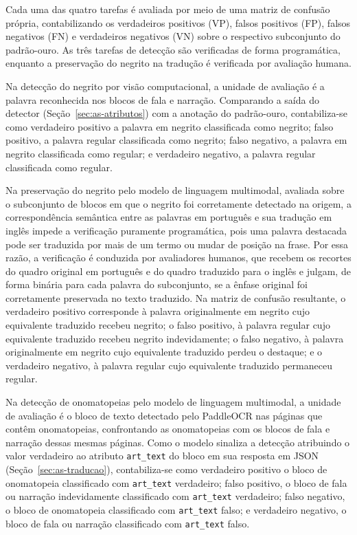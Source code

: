\documentclass[
    12pt,
    openright,
    oneside,
    a4paper,
    chapter=TITLE,
    section=TITLE,
    english,
    brazilian,
    brazil
]{abntex2}
\begin{document}
Cada uma das quatro tarefas é avaliada por meio de uma matriz de confusão própria, contabilizando os verdadeiros positivos (VP), falsos positivos (FP), falsos negativos (FN) e verdadeiros negativos (VN) sobre o respectivo subconjunto do padrão-ouro. As três tarefas de detecção são verificadas de forma programática, enquanto a preservação do negrito na tradução é verificada por avaliação humana.

Na detecção do negrito por visão computacional, a unidade de avaliação é a palavra reconhecida nos blocos de fala e narração. Comparando a saída do detector (Seção~\ref{sec:as-atributos}) com a anotação do padrão-ouro, contabiliza-se como verdadeiro positivo a palavra em negrito classificada como negrito; falso positivo, a palavra regular classificada como negrito; falso negativo, a palavra em negrito classificada como regular; e verdadeiro negativo, a palavra regular classificada como regular.

Na preservação do negrito pelo modelo de linguagem multimodal, avaliada sobre o subconjunto de blocos em que o negrito foi corretamente detectado na origem, a correspondência semântica entre as palavras em português e sua tradução em inglês impede a verificação puramente programática, pois uma palavra destacada pode ser traduzida por mais de um termo ou mudar de posição na frase. Por essa razão, a verificação é conduzida por avaliadores humanos, que recebem os recortes do quadro original em português e do quadro traduzido para o inglês e julgam, de forma binária para cada palavra do subconjunto, se a ênfase original foi corretamente preservada no texto traduzido. Na matriz de confusão resultante, o verdadeiro positivo corresponde à palavra originalmente em negrito cujo equivalente traduzido recebeu negrito; o falso positivo, à palavra regular cujo equivalente traduzido recebeu negrito indevidamente; o falso negativo, à palavra originalmente em negrito cujo equivalente traduzido perdeu o destaque; e o verdadeiro negativo, à palavra regular cujo equivalente traduzido permaneceu regular.

Na detecção de onomatopeias pelo modelo de linguagem multimodal, a unidade de avaliação é o bloco de texto detectado pelo PaddleOCR nas páginas que contêm onomatopeias, confrontando as onomatopeias com os blocos de fala e narração dessas mesmas páginas. Como o modelo sinaliza a detecção atribuindo o valor verdadeiro ao atributo \texttt{art\_text} do bloco em sua resposta em JSON (Seção~\ref{sec:as-traducao}), contabiliza-se como verdadeiro positivo o bloco de onomatopeia classificado com \texttt{art\_text} verdadeiro; falso positivo, o bloco de fala ou narração indevidamente classificado com \texttt{art\_text} verdadeiro; falso negativo, o bloco de onomatopeia classificado com \texttt{art\_text} falso; e verdadeiro negativo, o bloco de fala ou narração classificado com \texttt{art\_text} falso.
\end{document}
